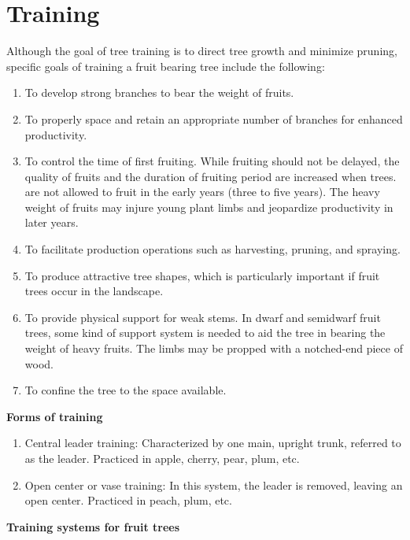 \documentclass[
]{article}
\providecommand{\tightlist}{%
  \setlength{\itemsep}{0pt}\setlength{\parskip}{0pt}}
\begin{document}
\hypertarget{training}{%
\section*{Training}\label{training}}

Although the goal of tree training is to direct tree growth and minimize pruning, specific goals of training a fruit bearing tree include the following:

\begin{enumerate}
\def\labelenumi{\arabic{enumi}.}
\tightlist
\item
  To develop strong branches to bear the weight of fruits.
\item
  To properly space and retain an appropriate number of branches for enhanced productivity.
\item
  To control the time of first fruiting. While fruiting should not be delayed, the quality of fruits and the duration of fruiting period are increased when trees. are not allowed to fruit in the early years (three to five years). The heavy weight of fruits may injure young plant limbs and jeopardize productivity in later years.
\item
  To facilitate production operations such as harvesting, pruning, and spraying.
\item
  To produce attractive tree shapes, which is particularly important if fruit trees occur in the landscape.
\item
  To provide physical support for weak stems. In dwarf and semidwarf fruit trees, some kind of support system is needed to aid the tree in bearing the weight of heavy fruits. The limbs may be propped with a notched-end piece of wood.
\item
  To confine the tree to the space available.
\end{enumerate}

\textbf{Forms of training}

\begin{enumerate}
\def\labelenumi{\arabic{enumi}.}
\tightlist
\item
  Central leader training: Characterized by one main, upright trunk, referred to as the leader. Practiced in apple, cherry, pear, plum, etc.
\item
  Open center or vase training: In this system, the leader is removed, leaving an open center. Practiced in peach, plum, etc.
\end{enumerate}

\textbf{Training systems for fruit trees}
\end{document}
